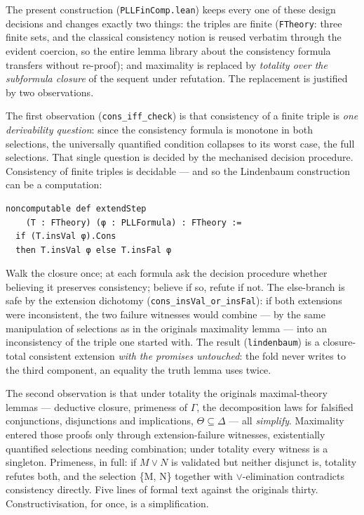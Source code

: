The present construction (\texttt{PLLFinComp.lean}) keeps every one of these
design decisions and changes exactly two things: the triples are finite
(\texttt{FTheory}: three finite sets, and the classical consistency notion is
reused verbatim through the evident coercion, so the entire lemma
library about the consistency formula transfers without re-proof); and
maximality is replaced by \emph{totality over the subformula closure} of the
sequent under refutation. The replacement is justified by two
observations.

The first observation (\texttt{cons\_iff\_check}) is that consistency of a
finite triple is \emph{one derivability question}: since the consistency
formula is monotone in both selections, the universally quantified
condition collapses to its worst case, the full selections. That single
question is decided by the mechanised decision procedure. Consistency
of finite triples is decidable --- and so the Lindenbaum construction can
be a computation:

\begin{lstlisting}
noncomputable def extendStep
    (T : FTheory) (φ : PLLFormula) : FTheory :=
  if (T.insVal φ).Cons
  then T.insVal φ else T.insFal φ
\end{lstlisting}

Walk the closure once; at each formula ask the decision procedure
whether believing it preserves consistency; believe if so, refute if
not. The else-branch is safe by the extension dichotomy
(\texttt{cons\_insVal\_or\_insFal}): if both extensions were inconsistent, the
two failure witnesses would combine --- by the same manipulation of selections as
in the original\textquotesingle s maximality lemma --- into an inconsistency of the
triple one started with. The result (\texttt{lindenbaum}) is a closure-total
consistent extension \emph{with the promises untouched}: the fold never
writes to the third component, an equality the truth lemma uses twice.

The second observation is that under totality the original\textquotesingle s
maximal-theory lemmas --- deductive closure, primeness of \ensuremath{\Gamma}, the
decomposition laws for falsified conjunctions, disjunctions and
implications, \ensuremath{\Theta \subseteq \Delta} --- all \emph{simplify}. Maximality entered those proofs
only through extension-failure witnesses, existentially quantified
selections needing combination; under totality every witness is a
singleton. Primeness, in full: if \ensuremath{M \vee N} is validated but neither
disjunct is, totality refutes both, and the selection \{M, N\} together
with \ensuremath{\vee}-elimination contradicts consistency directly. Five lines of
formal text against the original\textquotesingle s thirty. Constructivisation, for
once, is a simplification.

